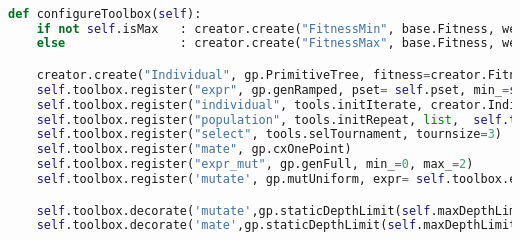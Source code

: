 \begin{landscape}
\begin{lstlisting}[language=Python,caption={The core method in Configuration class that configures the DEAP framework},label={lst:config}]

def configureToolbox(self):
    if not self.isMax   : creator.create("FitnessMin", base.Fitness, weights=(-1.0,))
    else                : creator.create("FitnessMax", base.Fitness, weights=(-1.0,))

    creator.create("Individual", gp.PrimitiveTree, fitness=creator.FitnessMin, pset=self.pset)
    self.toolbox.register("expr", gp.genRamped, pset= self.pset, min_=self.depthInitialMin, max_=self.depthInitialMax)
    self.toolbox.register("individual", tools.initIterate, creator.Individual,  self.toolbox.expr)
    self.toolbox.register("population", tools.initRepeat, list,  self.toolbox.individual)
    self.toolbox.register("select", tools.selTournament, tournsize=3)
    self.toolbox.register("mate", gp.cxOnePoint)
    self.toolbox.register("expr_mut", gp.genFull, min_=0, max_=2)
    self.toolbox.register('mutate', gp.mutUniform, expr= self.toolbox.expr_mut)

	self.toolbox.decorate('mutate',gp.staticDepthLimit(self.maxDepthLimit))
    self.toolbox.decorate('mate',gp.staticDepthLimit(self.maxDepthLimit))
\end{lstlisting}
\end{landscape}	